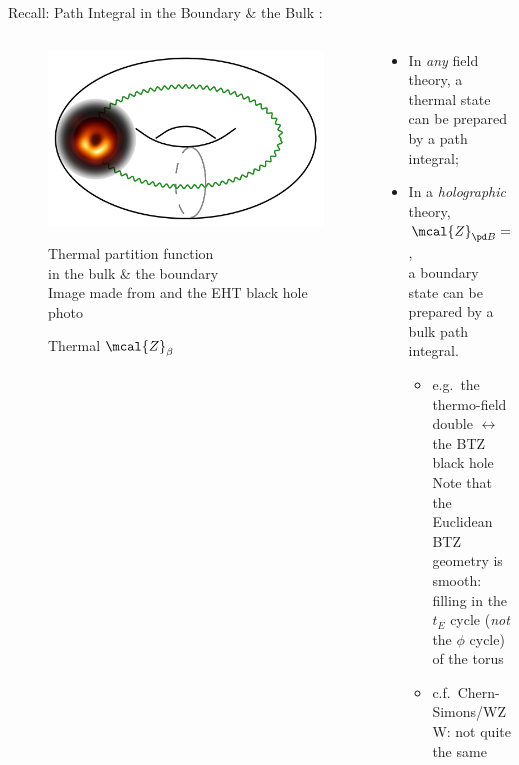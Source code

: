 \documentclass[aspectratio=169,10pt
	,noamsthm
]{beamer}
\begin{document}
\begin{frame}{Recall: Path Integral in the Boundary \& the Bulk}{%
	\textcite{Lewkowycz:2013nqa}:\,%
}
	\begin{columns}
	\begin{column}{.3\textwidth}
		\begin{figure}[!h]
		\centering
		\includegraphics[width=\linewidth]{img/blackhole_donut.png}
		\caption{Thermal $\mcal{Z}_\beta$}
		
		\footnotesize
		Thermal partition function \\ in the bulk \& the boundary
		\\[2ex]
		\scriptsize
		Image made from \textcite{Benjamin:2020mfz} and the EHT black hole photo
		\end{figure}
	\end{column}
	\begin{column}{.7\textwidth}
		\begin{itemize}
		\item In \textit{any} field theory, a thermal state\\ can be prepared by a path integral;
		\item In a \textit{holographic} theory, $
			\mcal{Z}_{\pd B} = \mcal{Z}_{B\textit{ulk}}
		$,\\
		a boundary state can be prepared by a bulk path integral.
	\pause
		\begin{itemize}
		\item e.g.~the thermo-field double $\leftrightarrow$ the BTZ black hole\\
			Note that the Euclidean BTZ geometry is smooth:\\
			filling in the $t_E$ cycle (\textit{not} the $\phi$ cycle) of the torus
		
		\item c.f.~Chern-Simons/WZW: not quite the same
		\end{itemize}
		\end{itemize}
	\end{column}
	\end{columns}
\end{frame}
\end{document}
